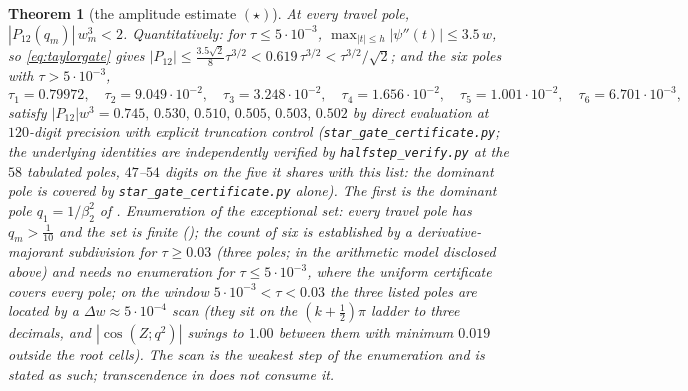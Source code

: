 \documentclass[11pt]{article}
\theoremstyle{plain}
\newtheorem{theorem}{Theorem}
\theoremstyle{definition}
\theoremstyle{remark}
\begin{document}
\begin{theorem}[the amplitude estimate $(\star)$]\label{thm:star}
At every travel pole, $|P_{12}(q_m)|\,w_m^3<2$. Quantitatively: for $\tau\le5\cdot10^{-3}$,
$\max_{|t|\le h}|\psi''(t)|\le3.5\,w$, so \eqref{eq:taylorgate} gives
$|P_{12}|\le\tfrac{3.5\sqrt2}8\tau^{3/2}<0.619\,\tau^{3/2}<\tau^{3/2}/\sqrt2$; and the six poles
with $\tau>5\cdot10^{-3}$,
\[
 \tau_1=0.79972,\quad \tau_2=9.049\cdot10^{-2},\quad \tau_3=3.248\cdot10^{-2},\quad
 \tau_4=1.656\cdot10^{-2},\quad \tau_5=1.001\cdot10^{-2},\quad \tau_6=6.701\cdot10^{-3},
\]
satisfy $|P_{12}|w^3=0.745,\,0.530,\,0.510,\,0.505,\,0.503,\,0.502$ by direct evaluation at
$120$-digit precision with explicit truncation control (\texttt{star\_gate\_certificate.py}; the
underlying identities are independently verified by \texttt{halfstep\_verify.py} at the $58$
tabulated poles, $47$--$54$ digits on the five it shares with this list: the dominant pole is
covered by \texttt{star\_gate\_certificate.py} alone). The first is the dominant pole $q_1=1/\beta_2^2$ of
{\cite[Corollary \textup{cor:beta}]{Bonfioli2026bA}}. Enumeration of the exceptional set: every travel pole has
$q_m>\tfrac1{10}$ and the set is finite ({\cite[Lemma ``The travel poles are locally finite'', \textup{lem:polefinite}]{Bonfioli2026bA}}); the count of six is
established by a derivative-majorant subdivision for $\tau\ge0.03$ (three poles; in the arithmetic
model disclosed above) and needs no enumeration for $\tau\le5\cdot10^{-3}$, where the uniform
certificate covers every pole; on the window $5\cdot10^{-3}<\tau<0.03$ the three listed poles are
located by a $\Delta w\approx5\cdot10^{-4}$ scan (they sit on the $(k+\tfrac12)\pi$ ladder to three
decimals, and $|\cos(Z;q^2)|$ swings to $1.00$ between them with minimum $0.019$ outside the root
cells). The scan is the weakest step of the enumeration and is stated as such; transcendence in
{\cite[Theorem \textup{thm:U}]{Bonfioli2026bA}} does not consume it.
\end{theorem}
\end{document}

